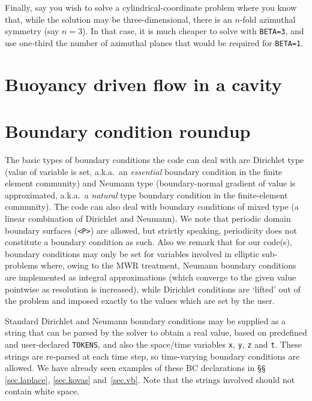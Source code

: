 \documentclass[11pt]{report}
\newcommand\threed{three-di\-men\-sion\-al}
\begin{document}
Finally, say you wish to solve a cylindrical-coordinate problem where
you know that, while the solution may be \threed, there is an $n$-fold
azimuthal symmetry (say $n=3$). In that case, it is much cheaper to
solve with \verb+BETA=3+, and use one-third the number of azimuthal
planes that would be required for \verb+BETA=1+.

\section{Buoyancy driven flow in a cavity}
\label{sec.tdrivcav}

\section{Boundary condition roundup}
\label{sec.bcs}

The basic types of boundary conditions the code can deal with are
Dirichlet type (value of variable is set, a.k.a.\ an \emph{essential}
boundary condition in the finite element community) and Neumann type
(boundary-normal gradient of value is approximated, a.k.a.\ a
\emph{natural} type boundary condition in the finite-element
community). The code can also deal with boundary conditions of mixed
type (a linear combination of Dirichlet and Neumann). We note that
periodic domain boundary surfaces (\verb|<P>|) are allowed, but
strictly speaking, periodicity does not constitute a boundary
condition as such.  Also we remark that for our code(s), boundary
conditions may only be set for variables involved in elliptic
sub-problems where, owing to the MWR treatment, Neumann boundary
conditions are implemented as integral approximations (which converge
to the given value pointwise as resolution is increased), while
Dirichlet conditions are `lifted' out of the problem and imposed
exactly to the values which are set by the user.

Standard Dirichlet and Neumann boundary conditions may be supplied as
a string that can be parsed by the solver to obtain a real value,
based on predefined and user-declared \verb|TOKENS|, and also the
space/time variables \verb|x|, \verb|y|, \verb|z| and \verb|t|.  These
strings are re-parsed at each time step, so time-varying boundary
conditions are allowed. We have already seen examples of these BC
declarations in \S\S\,\ref{sec.laplace}, \ref{sec.kovas}
and~\ref{sec.vb}.  Note that the strings involved should not contain
white space.  
\end{document}
